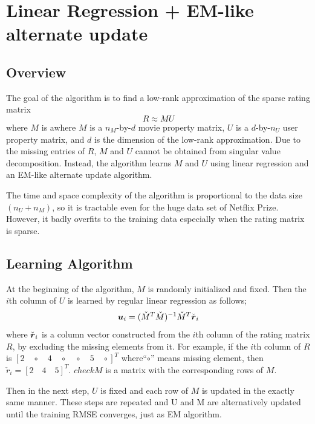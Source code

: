 \documentclass{article}
\begin{document}
\fi

\section{Linear Regression + EM-like alternate update}

\subsection{Overview}
The goal of the algorithm is to find a low-rank approximation of the sparse rating matrix 
\begin{equation}
R \approx MU
\end{equation}
where $M$ is awhere $M$ is a $n_M$-by-$d$ movie property matrix, $U$ is a
$d$-by-$n_U$ user property matrix, and $d$ is the dimension of the
low-rank approximation. Due to the missing entries of $R$, $M$ and $U$
cannot be obtained from singular value decomposition. Instead, the
algorithm learns $M$ and $U$ using linear regression and an EM-like
alternate update algorithm.

The time and space complexity of the algorithm is proportional to the data size $(n_U+n_M)$, so it is tractable even for the huge data set of Netflix Prize. However, it badly overfits to the training data especially when the rating matrix is sparse.

\subsection{Learning Algorithm}

At the beginning of the algorithm, $M$ is randomly initialized and fixed. Then the $i$th column of $U$ is learned by regular linear regression as follows;
\begin{equation}
{\mbox{\boldmath $u$}}_i=(\check{M}^T\check{M})^{-1}\check{M}^T \check{{\mbox{\boldmath $r$}}}_i \label{eq:lrem_core}
\end{equation}
where $\check{{\mbox{\boldmath $r$}}}_i$ is a column vector constructed from the $i$th column of the rating matrix $R$, by excluding the missing elements from it. For example, if the $i$th column of $R$ is $[2 \quad \circ \quad 4 \quad \circ \quad \circ \quad 5 \quad \circ]^T$ where``$\circ$'' means missing element, then $\check{r}_i = [2 \quad 4 \quad 5]^T$. $check{M}$ is a matrix with the corresponding rows of $M$.

Then in the next step, $U$ is fixed and each row of $M$ is updated in the exactly same manner. These steps are repeated and U and M are alternatively updated until the training RMSE converges, just as EM algorithm. 
\end{document}
